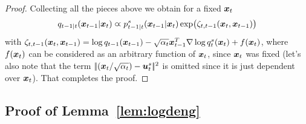 \begin{proof}
Collecting all the pieces above we obtain  
for a fixed $\x_t$ 
\begin{align*}
  \Fdd_{t-1|t}(\x_{t-1}|\x_t)  \varpropto \Bdds_{t-1|t}(\x_{t-1}|\x_t)\exp\bigl( \zeta_{t,t-1}(\x_t,\x_{t-1})\bigr)
\end{align*}
with $\zeta_{t,t-1}(\x_t,\x_{t-1})= \log \Fdd_{t-1}(\x_{t-1})-\sqrt{\alpha_t}\x_{t-1}^T\nabla \log \Fdds_t(\x_t)+f(\x_t)$, where $f(\x_t)$ can be considered as an arbitrary function of $\x_t$, since $\x_t$ was fixed (let's also note that the term $\norm{(\x_{t}/\sqrt{\alpha_t})-\us_t}^2$ is omitted since it is just dependent over $\x_t$).
That completes the proof. 


\end{proof}

\subsection{Proof of Lemma~\ref{lem:logdeng}}\label{proof:loggaussian}
